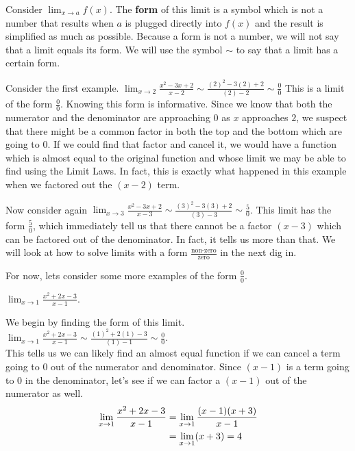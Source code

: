 \documentclass{ximera}
\begin{document}
\begin{definition}
Consider $\lim_{x\to a}f(x)$.  The \textbf{form} of this limit is a symbol which is not a number that results when $a$ is plugged directly into $f(x)$ and the result is simplified as much as possible.  Because a form is not a number, we will not say that a limit equals its form.  We will use the symbol $\sim$ to say that a limit has a certain form.
\end{definition} 

Consider the first example.  $\lim_{x\to 2}\frac{x^2-3x+2}{x-2} \sim \frac{(2)^2-3(2)+2}{(2)-2} \sim \frac{0}{0}$  This is a limit of the form $\frac{0}{0}$.  Knowing this form is informative.  Since we know that both the numerator and the denominator are approaching 0 as $x$ approaches $2$, we suspect that there might be a common factor in both the top and the bottom which are going to 0.  If we could find that factor and cancel it, we would have a function which is almost equal to the original function and whose limit we may be able to find using the Limit Laws.  In fact, this is exactly what happened in this example when we factored out the $(x-2)$ term.

Now consider again $\lim_{x\to 3}\frac{x^2-3x+2}{x-3} \sim \frac{(3)^2-3(3)+2}{(3)-3} \sim \frac{5}{0}$.  This limit has the form $\frac{5}{0}$, which immediately tell us that there cannot be a factor $(x-3)$ which can be factored out of the denominator.  In fact, it tells us more than that.  We will look at how to solve limits with a form $\frac{\text{non-zero}}{\text{zero}}$ in the next dig in.

For now, lets consider some more examples of the form $\frac{0}{0}$.

\begin{example}
$\lim_{x\to1}\frac{x^2+2x-3}{x-1}$. 
\begin{solution}
We begin by finding the form of this limit.  \\ $\lim_{x\to1}\frac{x^2+2x-3}{x-1} \sim \frac{(1)^2+2(1)-3}{(1)-1} \sim \frac{0}{0}$. \\
This tells us we can likely find an almost equal function if we can cancel a term going to 0 out of the numerator and denominator.  Since $(x-1)$ is a term going to 0 in the denominator, let's see if we can factor a $(x-1)$ out of the numerator as well.
\begin{align*}
\lim_{x\to1}{x^2+2x-3\over x-1}&=\lim_{x\to1}{(x-1)(x+3)\over x-1} \\
&=\lim_{x\to1}(x+3)=4
\end{align*}
\end{solution}
\end{example}
\end{document}
